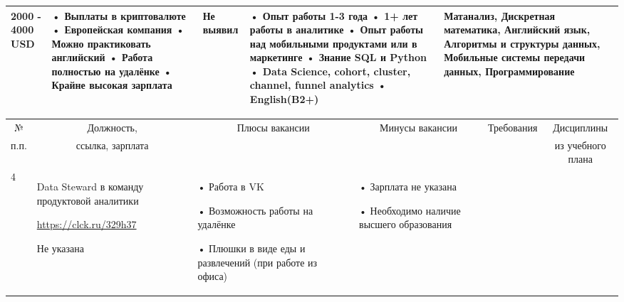 \begin{landscape}
\begin{table}[H]
\begin{center}
\begin{small}
\begin{tabular}{|p{0.1cm}|p{5cm}|p{4.5cm}|p{4.5cm}|p{4cm}|p{3cm}|}
			2000 - 4000 USD &
			• Выплаты в криптовалюте
			\newline• Европейская компания
			\newline• Можно практиковать английский
			\newline• Работа полностью на удалёнке
			\newline• Крайне высокая зарплата
			&
			Не выявил
			&
			• Опыт работы 1-3 года
			\newline• 1+ лет работы в аналитике
			\newline• Опыт работы над мобильными продуктами или в маркетинге
			\newline• Знание SQL и Python
			\newline• Data Science, cohort, cluster, channel, funnel analytics
			\newline• English(B2+)
			&
			Матанализ, Дискретная математика, Английский язык, Алгоритмы и структуры данных, Мобильные системы передачи данных, Программирование
			\\
			\hline
			\end{tabular}
		\end{small}
	\end{center}
\end{table}
			
			

\begin{table}[H]
	\begin{center}
		\begin{small}
		\begin{tabular}{|p{0.1cm}|p{5cm}|p{4.5cm}|p{4.5cm}|p{4cm}|p{3cm}|} \hline
			\multicolumn{1}{|c|}{№}&\multicolumn{1}{c|}{Должность,}&\multicolumn{1}{c|}{Плюсы вакансии}&\multicolumn{1}{c|}{Минусы вакансии}&\multicolumn{1}{c|}{Требования}&\multicolumn{1}{c|}{Дисциплины}\\ 
			\multicolumn{1}{|c|}{п.п.}&\multicolumn{1}{c|}{ссылка, зарплата}&\multicolumn{1}{c|}{}&\multicolumn{1}{c|}{}&\multicolumn{1}{c|}{}&\multicolumn{1}{c|}{из учебного плана}\\ 
			\hline
				4 & Data Steward в команду продуктовой аналитики
				
				\url{https://clck.ru/329h37}
				
				Не указана &
				• Работа в VK
				
				• Возможность работы на удалёнке
				
				• Плюшки в виде еды и развлечений (при работе из офиса)
				&
				• Зарплата не указана
				
				• Необходимо наличие высшего образования
				

\end{tabular}
\end{small}
\end{center}
\end{table}
\end{landscape}

